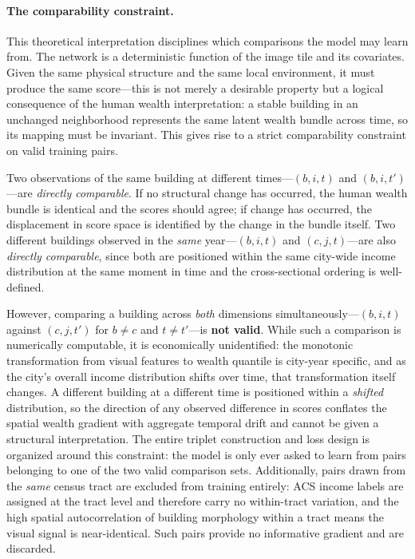\documentclass{article}
\begin{document}
\paragraph{The comparability constraint.}
This theoretical interpretation disciplines which comparisons the model may learn from. The network is a deterministic function of the image tile and its covariates. Given the same physical structure and the same local environment, it must produce the same score---this is not merely a desirable property but a logical consequence of the human wealth interpretation: a stable building in an unchanged neighborhood represents the same latent wealth bundle across time, so its mapping must be invariant. This gives rise to a strict comparability constraint on valid training pairs.

Two observations of the same building at different times---$(b, i, t)$ and $(b, i, t')$---are \textit{directly comparable}. If no structural change has occurred, the human wealth bundle is identical and the scores should agree; if change has occurred, the displacement in score space is identified by the change in the bundle itself. Two different buildings observed in the \textit{same} year---$(b, i, t)$ and $(c, j, t)$---are also \textit{directly comparable}, since both are positioned within the same city-wide income distribution at the same moment in time and the cross-sectional ordering is well-defined.

However, comparing a building across \textit{both} dimensions simultaneously---$(b, i, t)$ against $(c, j, t')$ for $b \neq c$ and $t \neq t'$---is \textbf{not valid}. While such a comparison is numerically computable, it is economically unidentified: the monotonic transformation from visual features to wealth quantile is city-year specific, and as the city's overall income distribution shifts over time, that transformation itself changes. A different building at a different time is positioned within a \textit{shifted} distribution, so the direction of any observed difference in scores conflates the spatial wealth gradient with aggregate temporal drift and cannot be given a structural interpretation. The entire triplet construction and loss design is organized around this constraint: the model is only ever asked to learn from pairs belonging to one of the two valid comparison sets. Additionally, pairs drawn from the \textit{same} census tract are excluded from training entirely: ACS income labels are assigned at the tract level and therefore carry no within-tract variation, and the high spatial autocorrelation of building morphology within a tract means the visual signal is near-identical. Such pairs provide no informative gradient and are discarded.
\end{document}
